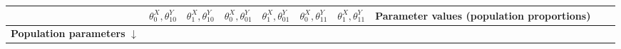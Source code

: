 \documentclass[12pt,]{book}
\begin{document}
\begin{longtable}[]{@{}cccccccccc@{}}
\begin{minipage}[b]{0.07\columnwidth}
\end{minipage} & \begin{minipage}[b]{0.07\columnwidth}\centering
\(\theta^X_0,\theta^Y_{10}\)\strut
\end{minipage} & \begin{minipage}[b]{0.07\columnwidth}\centering
\(\theta^X_1,\theta^Y_{10}\)\strut
\end{minipage} & \begin{minipage}[b]{0.07\columnwidth}\centering
\(\theta^X_0,\theta^Y_{01}\)\strut
\end{minipage} & \begin{minipage}[b]{0.07\columnwidth}\centering
\(\theta^X_1,\theta^Y_{01}\)\strut
\end{minipage} & \begin{minipage}[b]{0.07\columnwidth}\centering
\(\theta^X_0,\theta^Y_{11}\)\strut
\end{minipage} & \begin{minipage}[b]{0.07\columnwidth}\centering
\(\theta^X_1,\theta^Y_{11}\)\strut
\end{minipage} & \begin{minipage}[b]{0.10\columnwidth}\centering
Parameter values (population proportions)\strut
\end{minipage}\tabularnewline
\midrule
\endhead
\begin{minipage}[t]{0.10\columnwidth}\centering
\textbf{Population parameters} \(\downarrow\)\strut
\end{minipage} & \begin{minipage}[t]{0.07\columnwidth}\centering
\strut
\end{minipage} & \begin{minipage}[t]{0.07\columnwidth}\centering
\strut
\end{minipage} & \begin{minipage}[t]{0.07\columnwidth}\centering
\strut
\end{minipage} & \begin{minipage}[t]{0.07\columnwidth}\centering
\strut
\end{minipage} & \begin{minipage}[t]{0.07\columnwidth}\centering
\strut
\end{minipage} & \begin{minipage}[t]{0.07\columnwidth}\centering
\strut
\end{minipage} & \begin{minipage}[t]{0.07\columnwidth}\centering
\strut
\end{minipage} & \begin{minipage}[t]{0.07\columnwidth}\centering

\end{minipage}
\end{longtable}
\end{document}
